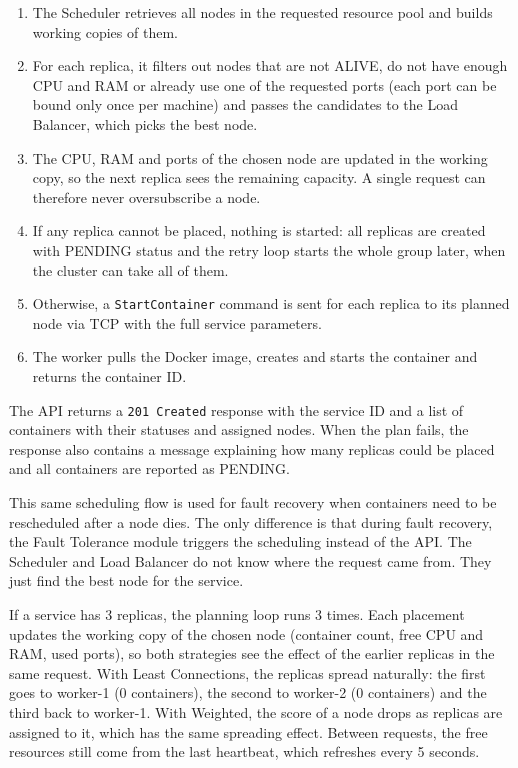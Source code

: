 \begin{enumerate}
    \item The Scheduler retrieves all nodes in the requested resource pool and builds working copies of them.
    \item For each replica, it filters out nodes that are not ALIVE, do not have enough CPU and RAM or already use one of the requested ports (each port can be bound only once per machine) and passes the candidates to the Load Balancer, which picks the best node.
    \item The CPU, RAM and ports of the chosen node are updated in the working copy, so the next replica sees the remaining capacity. A single request can therefore never oversubscribe a node.
    \item If any replica cannot be placed, nothing is started: all replicas are created with PENDING status and the retry loop starts the whole group later, when the cluster can take all of them.
    \item Otherwise, a \texttt{StartContainer} command is sent for each replica to its planned node via TCP with the full service parameters.
    \item The worker pulls the Docker image, creates and starts the container and returns the container ID.
\end{enumerate}

The API returns a \texttt{201 Created} response with the service ID and a list of containers with their statuses and assigned nodes. When the plan fails, the response also contains a message explaining how many replicas could be placed and all containers are reported as PENDING.

This same scheduling flow is used for fault recovery when containers need to be rescheduled after a node dies. The only difference is that during fault recovery, the Fault Tolerance module triggers the scheduling instead of the API. The Scheduler and Load Balancer do not know where the request came from. They just find the best node for the service.

If a service has 3 replicas, the planning loop runs 3 times. Each placement updates the working copy of the chosen node (container count, free CPU and RAM, used ports), so both strategies see the effect of the earlier replicas in the same request. With Least Connections, the replicas spread naturally: the first goes to worker-1 (0 containers), the second to worker-2 (0 containers) and the third back to worker-1. With Weighted, the score of a node drops as replicas are assigned to it, which has the same spreading effect. Between requests, the free resources still come from the last heartbeat, which refreshes every 5 seconds.

